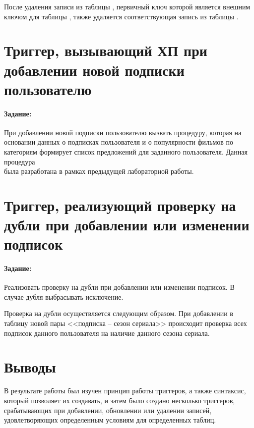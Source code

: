 

После удаления записи из таблицы , первичный ключ которой является внешним ключом для таблицы , также удаляется соответствующая запись из таблицы .

\section{Триггер, вызывающий ХП при добавлении новой подписки пользователю}

\paragraph{Задание:} При добавлении новой подписки пользователю вызвать процедуру, которая на основании данных о подписках пользователя и о популярности фильмов по категориям формирует список предложений для заданного пользователя. Данная процедура \\ была разработана в рамках предыдущей лабораторной работы.



\section{Триггер, реализующий проверку на дубли при добавлении или изменении подписок}

\paragraph{Задание:} Реализовать проверку на дубли при добавлении или изменении подписок. В случае дубля выбрасывать исключение.



Проверка на дубли осуществляется следующим образом. При добавлении в таблицу  новой пары <<подписка -- сезон сериала>> происходит проверка всех подписок данного пользователя на наличие данного сезона сериала.

\section{Выводы}

В результате работы был изучен принцип работы триггеров, а также синтаксис, который позволяет их создавать, и затем было создано несколько триггеров, срабатывающих при добавлении, обновлении или удалении записей, удовлетворяющих определенным условиям для определенных таблиц.


